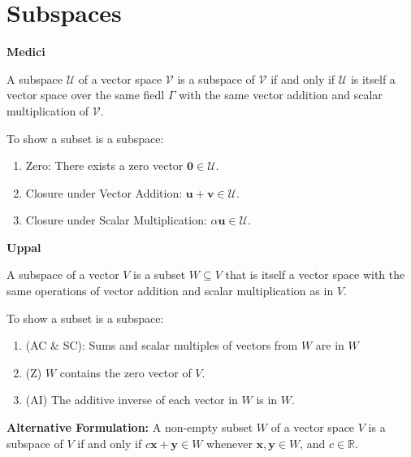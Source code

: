 \documentclass{article}
\newcommand{\bff}[1]{\mathbf{#1}}
\begin{document}
    \section{Subspaces}
    \begin{minipage}[t]{.45\textwidth} %
        \begin{center}
            \textbf{Medici}
        \end{center}
        A subspace $\mathcal{U}$ of a vector space $\mathcal{V}$ is a subspace of $\mathcal{V}$ if and only if $\mathcal{U}$ is itself a vector space over the same fiedl $\Gamma$ with the same vector addition and scalar multiplication of $\mathcal{V}$.
        \vspace{2mm}

        To show a subset is a subspace:
        \vspace{2mm}
        \begin{enumerate}[label=\textbf{S\Roman*.}]
            \item Zero: There exists a zero vector $\bm{0} \in \mathcal{U}$.
            \item Closure under Vector Addition: $\bm{u}+\bm{v} \in \mathcal{U}$.
            \item Closure under Scalar Multiplication: $\alpha\bm{u}\in\mathcal{U}$.
        \end{enumerate}
    \end{minipage}
    \hfill
    \begin{minipage}[t]{.45\textwidth} %
        \begin{center}
            \textbf{Uppal}
        \end{center}
        A subspace of a vector $V$ is a subset $W \subseteq V$ that is itself a vector space with the same operations of vector addition and scalar multiplication as in $V$.
        \vspace{2mm}

        To show a subset is a subspace:
        \vspace{2mm}
        \begin{enumerate}
            \item (AC \& SC): Sums and scalar multiples of vectors from $W$ are in $W$
            \item (Z) $W$ contains the zero vector of $V$.
            \item (AI) The additive inverse of each vector in $W$ is in $W$.
        \end{enumerate}
        \vspace{2mm}

        \textbf{Alternative Formulation:} A non-empty subset $W$ of a vector space $V$ is a subspace of $V$ if and only if $c\bff{x}+\bff{y} \in W$ whenever $\bff{x},\bff{y} \in W$, and $c \in \mathbb{R}$.
    \end{minipage}
\end{document}
